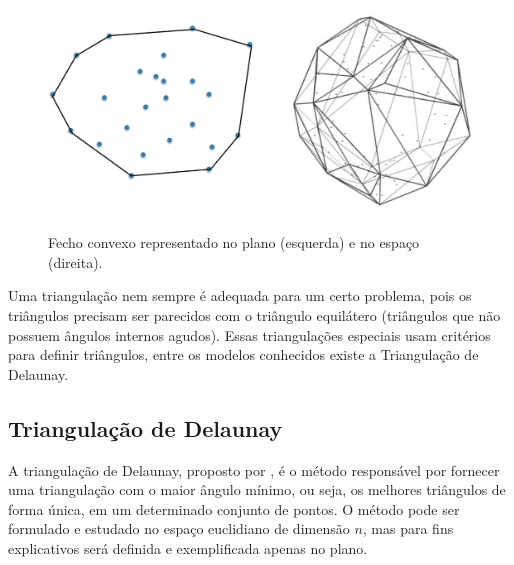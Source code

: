 \begin{figure}[H]
    \centering
    \caption{Fecho convexo representado no plano (esquerda) e no espaço (direita).}
    \includegraphics[scale=0.4]{dados/figuras/convex_hull.png}
    \label{fig:convex_hull}
\end{figure}

Uma triangulação nem sempre é adequada para um certo problema, pois os triângulos precisam ser parecidos com o triângulo equilátero (triângulos que não possuem ângulos internos agudos). Essas triangulações especiais usam critérios para definir triângulos, entre os modelos conhecidos existe a Triangulação de Delaunay.


\subsection{Triangulação de Delaunay}
\label{sec:delaunay}
A triangulação de Delaunay, proposto por \cite{delaunay1934sphere}, é o método responsável por fornecer uma triangulação com o maior ângulo mínimo, ou seja, os melhores triângulos de forma única, em um determinado conjunto de pontos. O método pode ser formulado e estudado no espaço euclidiano de dimensão $n$, mas para fins explicativos será definida e exemplificada apenas no plano.

